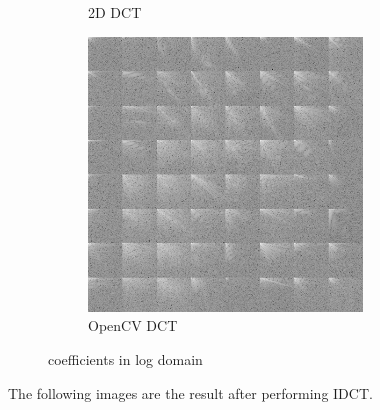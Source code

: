 \documentclass{homework}
\begin{document}
\begin{figure}[H]
\begin{subfigure}{0.32\textwidth}
        \caption{2D DCT}
    \end{subfigure}
    \begin{subfigure}{0.32\textwidth}
        \centering
        \includegraphics[width=0.8\textwidth]{dct_opencv.png}
        \caption{OpenCV DCT}
    \end{subfigure}
    \caption{coefficients in log domain}
\end{figure}

The following images are the result after performing IDCT.
\end{document}
